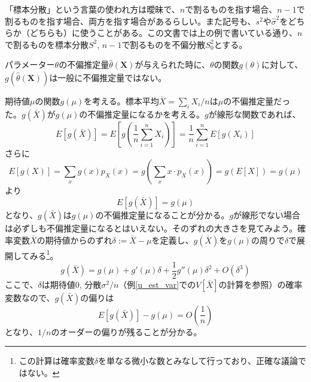 \documentclass[uplatex,dvipdfmx]{jlreq}
\begin{document}
\begin{note}
    「標本分散」という言葉の使われ方は曖昧で、$n$で割るものを指す場合、$n-1$で割るものを指す場合、両方を指す場合があるらしい。また記号も、$s^2$や$\hat{\sigma}^2$をどちらか（どちらも）に使うことがある。この文書では上の例で書いている通り、$n$で割るものを標本分散$S^2$, $n-1$で割るものを不偏分散$S_0^2$とする。
\end{note}

パラメーター$\theta$の不偏推定量$\hat{\theta}(\boldsymbol{X})$が与えられた時に、$\theta$の関数$g(\theta)$に対して、$g(\hat{\theta}(\boldsymbol{X}))$は一般に不偏推定量ではない。

\begin{example}
    期待値$\mu$の関数$g(\mu)$を考える。標本平均$\bar{X}=\sum_i X_i/n$は$\mu$の不偏推定量だった。$g(\bar{X})$が$g(\mu)$の不偏推定量になるかを考える。$g$が線形な関数であれば、
    \begin{equation}
        E[g(\bar{X})]
        = E\left[g\left(\frac{1}{n}\sum_{i=1}^n X_i\right)\right]
        = \frac{1}{n}\sum_{i=1}^n E[g(X_i)]
    \end{equation}
    さらに
    \begin{equation}
        E[g(X)] = \sum_x g(x)p_X(x)
        = g\left(\sum_x x\cdot p_X(x)\right)
        = g(E[X]) = g(\mu)
    \end{equation}
    より
    \begin{equation}
        E[g(\bar{X})] = g(\mu)
    \end{equation}
    となり、$g(\bar{X})$は$g(\mu)$の不偏推定量になることが分かる。$g$が線形でない場合は必ずしも不偏推定量になるとはいえない。そのずれの大きさを見てみよう。確率変数$\bar{X}$の期待値からのずれ$\delta := \bar{X} - \mu$を定義し、$g(\bar{X})$を$g(\mu)$の周りで$\delta$で展開してみる\footnote{この計算は確率変数$\delta$を単なる微小な数とみなして行っており、正確な議論ではない。}。
    \begin{equation}
        g(\bar{X})
        = g(\mu) + g'(\mu)\delta + \frac{1}{2}g''(\mu)\delta^2 + O(\delta^3)
    \end{equation}
    ここで、$\delta$は期待値0, 分散$\sigma^2/n$（例\ref{u_est_var}での$V[\bar{X}]$の計算を参照）の確率変数なので、$g(\bar{X})$の偏りは
    \begin{equation}
        E[g(\bar{X})] - g(\mu) = O\left(\frac{1}{n}\right)
    \end{equation}
    となり、$1/n$のオーダーの偏りが残ることが分かる。
\end{example}
\end{document}

